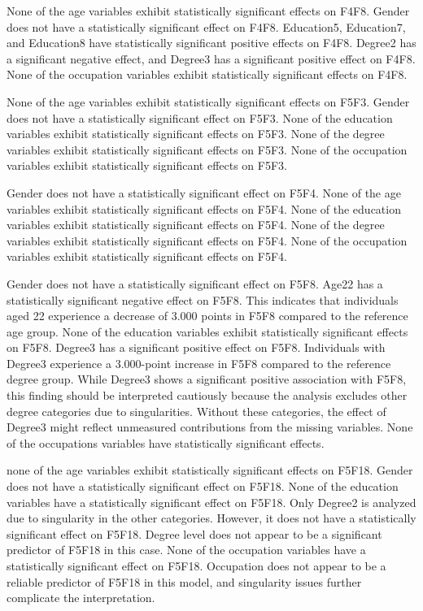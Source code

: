 \documentclass[
  12pt,
  a4paper,
  twoside]{article}
\begin{document}
None of the age variables exhibit statistically significant effects on F4F8.
Gender does not have a statistically significant effect on F4F8.
Education5, Education7, and Education8 have statistically significant positive effects on F4F8.
Degree2 has a significant negative effect, and Degree3 has a significant positive effect on F4F8.
None of the occupation variables exhibit statistically significant effects on F4F8.

None of the age variables exhibit statistically significant effects on F5F3.
Gender does not have a statistically significant effect on F5F3.
None of the education variables exhibit statistically significant effects on F5F3.
None of the degree variables exhibit statistically significant effects on F5F3.
None of the occupation variables exhibit statistically significant effects on F5F3.

Gender does not have a statistically significant effect on F5F4.
None of the age variables exhibit statistically significant effects on F5F4.
None of the education variables exhibit statistically significant effects on F5F4.
None of the degree variables exhibit statistically significant effects on F5F4.
None of the occupation variables exhibit statistically significant effects on F5F4.

Gender does not have a statistically significant effect on F5F8.
Age22 has a statistically significant negative effect on F5F8.
This indicates that individuals aged 22 experience a decrease of 3.000 points in F5F8 compared to the reference age group.
None of the education variables exhibit statistically significant effects on F5F8.
Degree3 has a significant positive effect on F5F8. Individuals with Degree3 experience a 3.000-point increase in F5F8 compared to the reference degree group.
While Degree3 shows a significant positive association with F5F8, this finding should be interpreted cautiously because the analysis excludes other degree categories due to singularities. Without these categories, the effect of Degree3 might reflect unmeasured contributions from the missing variables.
None of the occupations variables have statistically significant effects.

none of the age variables exhibit statistically significant effects on F5F18.
Gender does not have a statistically significant effect on F5F18.
None of the education variables have a statistically significant effect on F5F18.
Only Degree2 is analyzed due to singularity in the other categories. However, it does not have a statistically significant effect on F5F18.
Degree level does not appear to be a significant predictor of F5F18 in this case.
None of the occupation variables have a statistically significant effect on F5F18. Occupation does not appear to be a reliable predictor of F5F18 in this model, and singularity issues further complicate the interpretation.
\end{document}

